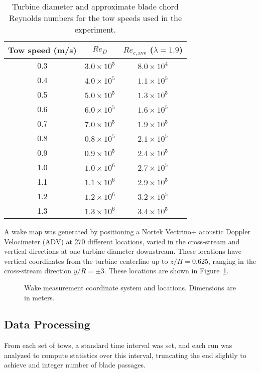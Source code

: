 \documentclass[energies,article,accept,moreauthors,pdftex,12pt,a4paper]{mdpi}
\begin{document}
\begin{table}
\centering
\begin{tabular}{ccc}
Tow speed (m/s) & $Re_D$ & $Re_{c,\mathrm{ave}}$ ($\lambda = 1.9$) \\ 
\hline
0.3 & $3.0 \times 10^5$ & $8.0 \times 10^4$ \\ 
0.4 & $4.0 \times 10^5$ & $1.1 \times 10^5$ \\ 
0.5 & $5.0 \times 10^5$ & $1.3 \times 10^5$ \\ 
0.6 & $6.0 \times 10^5$ & $1.6 \times 10^5$ \\ 
0.7 & $7.0 \times 10^5$ & $1.9 \times 10^5$ \\ 
0.8 & $0.8 \times 10^5$ & $2.1 \times 10^5$ \\ 
0.9 & $0.9 \times 10^5$ & $2.4 \times 10^5$ \\ 
1.0 & $1.0 \times 10^6$ & $2.7 \times 10^5$ \\ 
1.1 & $1.1 \times 10^6$ & $2.9 \times 10^5$ \\ 
1.2 & $1.2 \times 10^6$ & $3.2 \times 10^5$ \\ 
1.3 & $1.3 \times 10^6$ & $3.4 \times 10^5$ \\ 
\end{tabular} 
\caption{Turbine diameter and approximate blade chord Reynolds numbers for the
tow speeds used in the experiment.}
\label{tab:Re}
\end{table}

A wake map was generated by positioning a Nortek Vectrino+ acoustic Doppler
Velocimeter (ADV) at 270 different locations, varied in the cross-stream and
vertical directions at one turbine diameter downstream. These locations have
vertical coordinates from the turbine centerline up to $z/H=0.625$, ranging in
the cross-stream direction $y/R = \pm 3$. These locations are shown in
Figure~\ref{fig:wake-locations}.

\begin{figure}
\centering
\caption{Wake measurement coordinate system and locations. Dimensions are in
meters.} 
\label{fig:wake-locations}
\end{figure}

\subsection{Data Processing}

From each set of tows, a standard time interval was set, and each run was
analyzed to compute statistics over this interval, truncating the end slightly
to achieve and integer number of blade passages.
\end{document}
